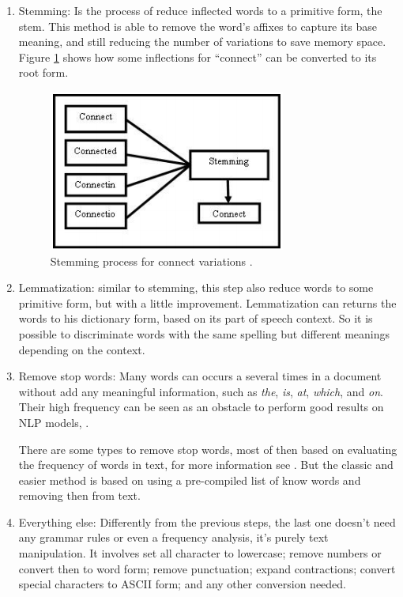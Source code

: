 	\begin{enumerate}
		\item Stemming: Is the process of reduce inflected words to a primitive form, the stem. This method is able to remove the word's affixes to capture its base meaning, and still reducing the number of variations to save memory space. Figure \ref{fig:stemming} shows how some inflections for ``connect'' can be converted to its root form.
		
		\begin{figure}[h!]
			\centering
			\includegraphics[width=0.45\linewidth]{01.Chapters/02.Background/stemming}
			\caption{Stemming process for connect variations \cite{vijayarani2015preprocessing}.}
			\label{fig:stemming}
		\end{figure}
		
		
		\item Lemmatization: similar to stemming, this step also reduce words to some primitive form, but with a little improvement. Lemmatization can returns the words to his dictionary form, based on its part of speech context. So it is possible to discriminate words with the same spelling but different meanings depending on the context. 	
		
		\item Remove stop words:
		Many words can occurs a several times in a document without add any meaningful information, such as \textit{the}, \textit{is}, \textit{at}, \textit{which}, and \textit{on}. Their high frequency can be seen as an obstacle to perform good results on NLP models, \cite{kannan2014preprocessing}. 
		
		There are some types to remove stop words, most of then based on evaluating the frequency of words in text, for more information see \cite{x}. But the classic and easier method is based on using a pre-compiled list of know words and removing then from text.
		
		\item Everything else:
		Differently from the previous steps, the last one doesn't need any grammar rules or even a frequency analysis, it's purely text manipulation. It involves set all character to lowercase; remove numbers or convert then to word form; remove punctuation; expand contractions; convert special characters to ASCII form; and any other conversion needed.		 	
	\end{enumerate}
	
